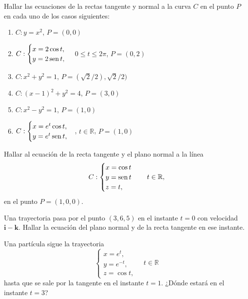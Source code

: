 {Hallar las ecuaciones de la rectas tangente y normal a la curva $C$ en el punto $P$ en cada uno de los casos siguientes:
\begin{enumerate}
\item $C: y=x^2$, $P=(0,0)$
\item $C: \begin{cases}
x=2\cos t,\\
y=2\operatorname{sen} t,
\end{cases}
$ $0\leq t\leq 2\pi$, $P=(0,2)$
\item $C:x^2+y^2=1$, $P=(\sqrt{2}/2),\sqrt{2}/2)$
\item $C:(x-1)^2+y^2=4$, $P=(3,0)$
\item $C:x^2-y^2=1$, $P=(1,0)$
\item $C:\begin{cases}
x=e^t\cos t,\\
y=e^t\operatorname{sen} t,
\end{cases}
$, $t\in \mathbb{R}$, $P=(1,0)$
\end{enumerate}
}
{
}
{
}


{Hallar al ecuación de la recta tangente y el plano normal a la línea
\[
C: 
\begin{cases}
x=\cos t \\
y=\operatorname{sen} t\\
z= t,
\end{cases}
\quad t\in \mathbb{R},
\]
en el punto $P=(1,0,0)$.
}
{
}
{
}


{Una trayectoria pasa por el punto $(3,6,5)$ en el instante $t=0$ con velocidad $\mathbf{i}-\mathbf{k}$. 
Hallar la ecuación del plano normal y de la recta tangente en ese instante.
}
{
}
{
}


{Una partícula sigue la trayectoria
\[
\begin{cases}
x=e^t,\\
y=e^{-t},\\
z=\cos t,
\end{cases}
\quad t\in \mathbb{R}
\]
hasta que se sale por la tangente en el instante $t=1$. ¿Dónde estará en el instante $t=3$?
}
{
}
{
}
